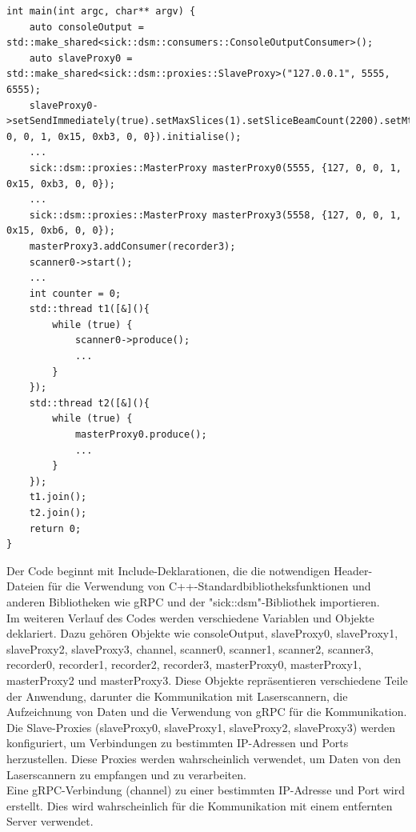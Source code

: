 \begin{lstlisting}[language={[Sharp]C}, caption={Client}, label={Script}]
int main(int argc, char** argv) {
    auto consoleOutput = std::make_shared<sick::dsm::consumers::ConsoleOutputConsumer>();
    auto slaveProxy0 = std::make_shared<sick::dsm::proxies::SlaveProxy>("127.0.0.1", 5555, 6555);
    slaveProxy0->setSendImmediately(true).setMaxSlices(1).setSliceBeamCount(2200).setMtuSize(1460).setIndex(0).setIdentifier({127, 0, 0, 1, 0x15, 0xb3, 0, 0}).initialise();
    ...
    sick::dsm::proxies::MasterProxy masterProxy0(5555, {127, 0, 0, 1, 0x15, 0xb3, 0, 0});
    ...
    sick::dsm::proxies::MasterProxy masterProxy3(5558, {127, 0, 0, 1, 0x15, 0xb6, 0, 0});
    masterProxy3.addConsumer(recorder3);
    scanner0->start();
    ...
    int counter = 0;
    std::thread t1([&](){
        while (true) {
            scanner0->produce();
            ...
        }
    });
    std::thread t2([&](){
        while (true) {
            masterProxy0.produce();
            ...
        }
    });
    t1.join();
    t2.join();
    return 0;
}
\end{lstlisting}
Der Code beginnt mit Include-Deklarationen, die die notwendigen Header-Dateien für die Verwendung von C++-Standardbibliotheksfunktionen und anderen Bibliotheken wie gRPC und der "sick::dsm"-Bibliothek importieren.\\

Im weiteren Verlauf des Codes werden verschiedene Variablen und Objekte deklariert. Dazu gehören Objekte wie consoleOutput, slaveProxy0, slaveProxy1, slaveProxy2, slaveProxy3, channel, scanner0, scanner1, scanner2, scanner3, recorder0, recorder1, recorder2, recorder3, masterProxy0, masterProxy1, masterProxy2 und masterProxy3. Diese Objekte repräsentieren verschiedene Teile der Anwendung, darunter die Kommunikation mit Laserscannern, die Aufzeichnung von Daten und die Verwendung von gRPC für die Kommunikation.\\

Die Slave-Proxies (slaveProxy0, slaveProxy1, slaveProxy2, slaveProxy3) werden konfiguriert, um Verbindungen zu bestimmten IP-Adressen und Ports herzustellen. Diese Proxies werden wahrscheinlich verwendet, um Daten von den Laserscannern zu empfangen und zu verarbeiten.\\

Eine gRPC-Verbindung (channel) zu einer bestimmten IP-Adresse und Port wird erstellt. Dies wird wahrscheinlich für die Kommunikation mit einem entfernten Server verwendet.\\

